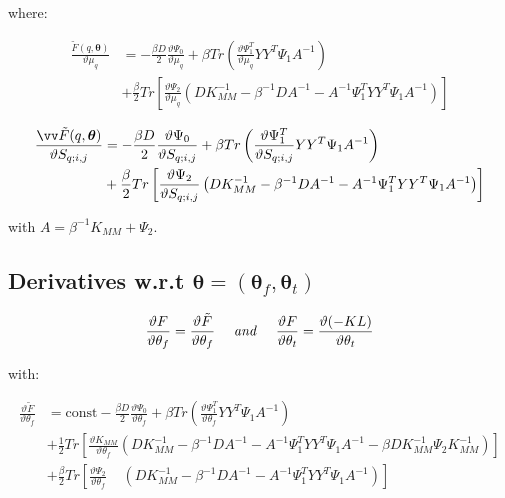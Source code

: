 where:

\begin{align}
 \frac{\tilde{F}(q, \boldsymbol \theta)}{\vartheta \mu_q}
{}& = - \frac{\beta D}{2} \frac{\vartheta \Psi_0}{\vartheta \mu_q}
    + \beta Tr \left(\frac{\vartheta \Psi_1^T}{\vartheta \mu_q} Y Y^T \Psi_1 A^{-1} \right) \nonumber \\
{}& + \frac{\beta}{2} Tr \left[ \frac{\vartheta \Psi_2}{\vartheta \mu_q}
       \left(
	  D K_{MM}^{-1} - \beta^{-1} D A^{-1} - A^{-1} \Psi_1^T Y Y^T \Psi_1 A^{-1}
       \right) \right] \label{derivFTildeEfficientComputationMu}
\end{align}


\begin{align}
 \frac{\vv \tilde{F}(q, \boldsymbol \theta)}{\vartheta S_{q;i,j}}
{}& = - \frac{\beta D}{2} \frac{\vartheta \Psi_0}{\vartheta S_{q;i,j}}
    + \beta Tr \left(\frac{\vartheta \Psi_1^T}{\vartheta S_{q;i,j}} Y Y^T \Psi_1 A^{-1} \right) \nonumber \\
{}& + \frac{\beta}{2} Tr \left[ \frac{\vartheta \Psi_2}{\vartheta S_{q;i,j}}
       \left(
	  D K_{MM}^{-1} - \beta^{-1} D A^{-1} - A^{-1} \Psi_1^T Y Y^T \Psi_1 A^{-1}
       \right) \right] \label{derivFTildeEfficientComputationS}
\end{align}


with $A=\beta^{-1}K_{MM}+\Psi_2$.





\subsection{Derivatives w.r.t $\boldsymbol \theta = (\boldsymbol \theta_f, \boldsymbol \theta_t)$}
\begin{equation}
   \label{DerivativeOfFComplete}
      \frac{\vartheta F}{\vartheta \theta_f} = \frac{\vartheta \tilde{F}}{\vartheta \theta_f}
\mbox{ \ \ \ \textit{and} \ \ \ } 
      \frac{\vartheta F}{\vartheta \theta_t} = \frac{\vartheta (-KL)}{\vartheta \theta_t}
\end{equation}

  with:

\begin{align}
\frac{\vartheta \tilde{F}}{\vartheta \theta_f} {}& = \text{const} - 
\frac{\beta D}{2} \frac{\vartheta \Psi_0}{\vartheta \theta_f}
 + \beta Tr \left(\frac{\vartheta \Psi_1^T}{\vartheta \theta_f} Y Y^T \Psi_1 A^{-1} \right) \nonumber \\
{}& + \frac{1}{2} Tr \left[ \frac{\vartheta K_{MM}}{\vartheta \theta_f}
        \left(
	   D K_{MM}^{-1} - \beta^{-1} D A^{-1} - A^{-1} \Psi_1^T Y Y^T \Psi_1 A^{-1} - \beta D K_{MM}^{-1} \Psi_2 K_{MM}^{-1} 
         \right) \right] \nonumber \\
{}& + \frac{\beta}{2} Tr \left[ \frac{\vartheta \Psi_2}{\vartheta \theta_f} \;\;\;\;
       \left(
	  D K_{MM}^{-1} - \beta^{-1} D A^{-1} - A^{-1} \Psi_1^T Y Y^T \Psi_1 A^{-1}
       \right) \right] \label{DerivativeOfFtildeComplete}
\end{align}


